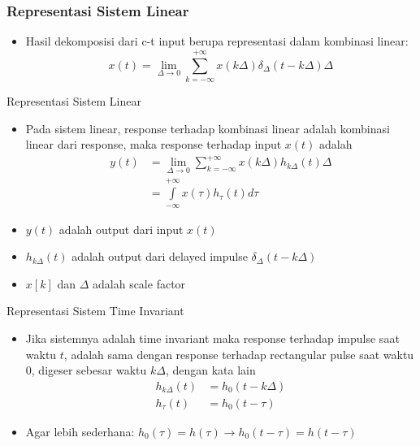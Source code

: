 \documentclass[pdflatex,compress,mathserif]{beamer}
\begin{document}
\begin{frame}
\begin{multicols}{2}
\begin{center}
		\end{center}
	\end{multicols}
\end{frame}

\begin{frame}
	\frametitle{Representasi Sistem Linear}
	\begin{itemize}
		\item Hasil dekomposisi dari c-t input berupa representasi dalam kombinasi linear:
		\begin{equation*}
		x(t) = \lim\limits_{\Delta \rightarrow 0}\sum\limits_{k = -\infty}^{+\infty} x(k\Delta)\delta_{\Delta}(t-k\Delta)\Delta
		\end{equation*}
	\end{itemize}
\end{frame}

\begin{frame}{Representasi Sistem Linear}
	\begin{itemize}
		\item Pada sistem linear, response terhadap kombinasi linear adalah kombinasi linear dari response, maka response terhadap input $ x(t) $ adalah
		\begin{align*}
		y(t) &= \lim\limits_{\Delta \rightarrow 0}\sum\limits_{k = -\infty}^{+\infty} x(k\Delta)h_{k\Delta}(t)\Delta \\
		&= \int\limits_{-\infty}^{+\infty}x(\tau)h_{\tau}(t)d\tau
		\end{align*}
		\item[] $ y(t) $ adalah output dari input $ x(t) $
		\item[] $ h_{k\Delta}(t) $ adalah output dari delayed impulse $ \delta_{\Delta}(t-k\Delta) $
		\item[] $ x[k] $ dan $ \Delta $ adalah scale factor
	\end{itemize}
\end{frame}

\begin{frame}{Representasi Sistem Time Invariant}
	\begin{itemize}
		\item Jika sistemnya adalah time invariant maka response terhadap impulse saat waktu $ t $, adalah sama dengan response terhadap rectangular pulse saat waktu 0, digeser sebesar waktu $ k\Delta $, dengan kata lain
		\begin{align*}
			h_{k\Delta}(t) &= h_0(t - k\Delta) \\
			h_{\tau}(t) &= h_0(t - \tau)
		\end{align*}
		\item Agar lebih sederhana: $ h_0(\tau) = h(\tau) \rightarrow h_0(t - \tau) = h(t - \tau) $
	\end{itemize}
\end{frame}
\end{document}
